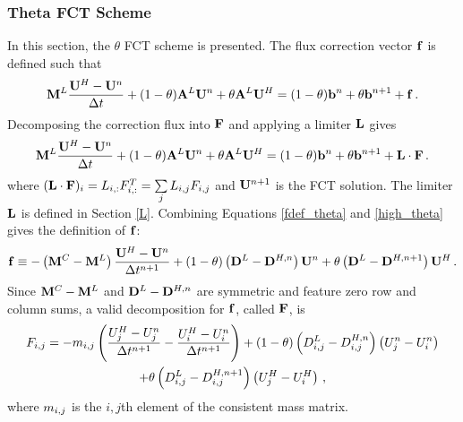 \subsubsection{Theta FCT Scheme}
In this section, the $\theta$ FCT scheme is presented.
The flux correction vector $\mathbf{f}$ is defined such that
\begin{equation}\label{fdef_theta}
  \mathbf{M}^L\frac{\mathbf{U}^H-\mathbf{U}^n}{\Delta t}
  + (1-\theta)\mathbf{A}^L\mathbf{U}^n + \theta\mathbf{A}^L\mathbf{U}^H
  = (1-\theta)\mathbf{b}^n + \theta\mathbf{b}^{n+1} + \mathbf{f} \,.
\end{equation}
Decomposing the correction flux into $\mathbf{F}$ and applying a limiter $\mathbf{L}$ gives
\begin{equation}\label{limited_theta}
  \mathbf{M}^L\frac{\mathbf{U}^H-\mathbf{U}^n}{\Delta t}
  + (1-\theta)\mathbf{A}^L\mathbf{U}^n + \theta\mathbf{A}^L\mathbf{U}^H
  = (1-\theta)\mathbf{b}^n + \theta\mathbf{b}^{n+1} + \mathbf{L}\cdot\mathbf{F} \,.
\end{equation}
where $(\mathbf{L}\cdot\mathbf{F})_i = L_{i,:}F_{i,:}^T = \sum\limits_j L_{i,j} F_{i,j}$
and $\mathbf{U}^{n+1}$ is the FCT solution. The limiter $\mathbf{L}$ is
defined in Section \ref{L}.
Combining Equations \eqref{fdef_theta} and \eqref{high_theta}
gives the definition of $\mathbf{f}$:
\begin{equation}\label{f_theta}
   \mathbf{f} \equiv -\left(\mathbf{M}^C-\mathbf{M}^L\right)\frac{\mathbf{U}^H-\mathbf{U}^n}{\Delta t^{n+1}}
   + (1-\theta)\left(\mathbf{D}^L-\mathbf{D}^{H,n}\right)\mathbf{U}^n 
   + \theta    \left(\mathbf{D}^L-\mathbf{D}^{H,n+1}\right)\mathbf{U}^H \,.
\end{equation}
Since $\mathbf{M}^C-\mathbf{M}^L$ and $\mathbf{D}^L-\mathbf{D}^{H,n}$ are symmetric
and feature zero row and column sums, a valid decomposition for $\mathbf{f}$,
called $\mathbf{F}$, is
\begin{multline}
   F_{i,j} = -m_{i,j}\left(\frac{U_j^H - U_j^n}{\Delta t^{n+1}}
   - \frac{U_i^H - U_i^n}{\Delta t^{n+1}}\right)
   + (1-\theta)\left(D_{i,j}^L-D_{i,j}^{H,n}\right)  \left(U_j^n - U_i^n\right)\\
   + \theta    \left(D_{i,j}^L-D_{i,j}^{H,n+1}\right)\left(U_j^H - U_i^H\right) \,,
\end{multline}
where $m_{i,j}$ is the $i,j$th element of the consistent mass matrix.
%

